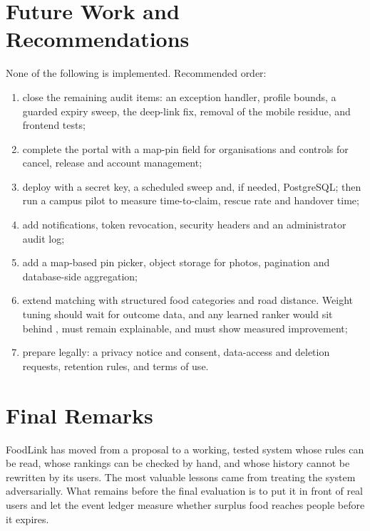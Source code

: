 \section{Future Work and Recommendations}
\label{sec:future}

None of the following is implemented. Recommended order:
\begin{enumerate}
  \item close the remaining audit items: an exception handler, profile bounds,
    a guarded expiry sweep, the deep-link fix, removal of the mobile residue,
    and frontend tests;
  \item complete the portal with a map-pin field for organisations and
    controls for cancel, release and account management;
  \item deploy with a secret key, a scheduled sweep and, if needed, PostgreSQL;
    then run a campus pilot to measure time-to-claim, rescue rate and handover
    time;
  \item add notifications, token revocation, security headers and an
    administrator audit log;
  \item add a map-based pin picker, object storage for photos, pagination and
    database-side aggregation;
  \item extend matching with structured food categories and road distance.
    Weight tuning should wait for outcome data, and any learned ranker would sit
    behind , must remain explainable, and must show measured
    improvement;
  \item prepare legally: a privacy notice and consent, data-access and deletion
    requests, retention rules, and terms of use.
\end{enumerate}

\section{Final Remarks}
\label{sec:remarks}

FoodLink has moved from a proposal to a working, tested system whose rules can
be read, whose rankings can be checked by hand, and whose history cannot be
rewritten by its users. The most valuable lessons came from treating the system
adversarially. What remains before the final evaluation is to put it in front of
real users and let the event ledger measure whether surplus food reaches people
before it expires.
